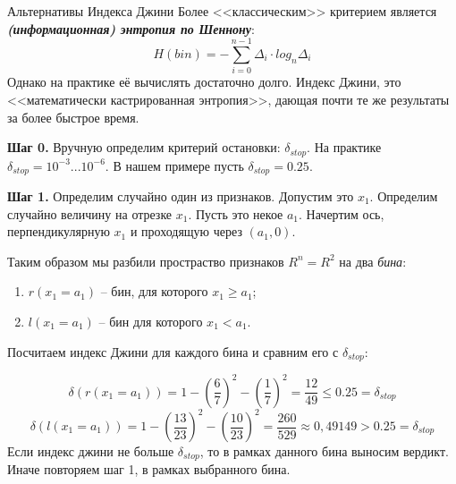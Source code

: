 \documentclass{beamer}
\newcommand{\termdef}[1]{\textbf{\textit{#1}}}
\newcommand{\term}{\textit}
\begin{document}
\begin{frame}{Альтернативы Индекса Джини}
	Более <<классическим>> критерием является 
	\termdef{(информационная) энтропия по Шеннону}:
	\begin{equation}
	H(bin) = - \sum_{i=0}^{n-1} \Delta_i \cdot log_n \Delta_i 
	\end{equation}
	Однако на практике её вычислять достаточно долго. 
	Индекс Джини, это <<математически кастрированная энтропия>>,
	дающая почти те же результаты за более быстрое время.
	\end{frame}
	
	
	
	
	\begin{frame}
	\footnotesize
	\textbf{Шаг 0.} Вручную определим критерий остановки: $\delta_{stop}$. На практике $\delta_{stop}=10^{-3}...10^{-6}$. В нашем примере пусть $\delta_{stop}=0.25$. 
	
	\textbf{Шаг 1.} Определим случайно один из признаков. Допустим это $x_1$. 
	Определим случайно величину на отрезке $x_1$. Пусть это некое $a_1$. 
	Начертим ось, перпендикулярную $x_1$ и проходящую через $(a_1, 0)$.
	\begin{center}
	\begin{tikzpicture}[scale=1.5]
	
	\end{tikzpicture}
	\end{center}
	Таким образом мы разбили простраство признаков
	$R^n=R^2$ на два \term{бина}:
	\begin{enumerate}
	\item $r(x_1=a_1)$ -- бин, для которого $x_1 \geqslant a_1$;
	\item $l(x_1=a_1)$ -- бин для которого $x_1 < a_1$.
	\end{enumerate}
\end{frame}

\begin{frame}
	\small
	Посчитаем индекс Джини для каждого бина и сравним его с $\delta_{stop}$:
	\begin{center}
	\begin{tikzpicture}[scale=1.5]
	
	\end{tikzpicture}
	\end{center}
	\begin{equation*}
	\delta \left(r(x_1=a_1)\right) = 
	1 - \left(\frac{6}{7}\right)^2 - \left( \frac{1}{7}\right)^2 =
	\frac{12}{49} \leqslant 0.25 = \delta_{stop}
	\end{equation*}
	\begin{equation*}
	\delta \left(l(x_1=a_1)\right) = 
	1 - \left( \frac{13}{23} \right)^2 - \left( \frac{10}{23} \right)^2 
	= \frac{260}{529} \approx 0,49149 > 0.25 = \delta_{stop}
	\end{equation*}
	Если индекс джини не больше $\delta_{stop}$, то в рамках данного бина выносим 
	вердикт. Иначе повторяем шаг 1, в рамках выбранного бина.
\end{frame}
\end{document}
